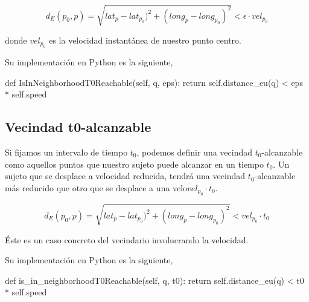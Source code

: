 \documentclass[a4paper, 12pt]{article}
\begin{document}
$$ d_E(p_0, p) = \sqrt{lat_{p} - lat_{p_0})^2 + (long_{p} - long_{p_0})^2 } < \epsilon \cdot vel_{p_0} $$

donde $vel_{p_0}$ es la velocidad instant\'anea de nuestro punto centro.


Su implementaci\'on en Python es la siguiente,

\begin{python}
        def IsInNeighborhoodT0Reachable(self, q, eps):
                return self.distance_eu(q) < eps * self.speed
\end{python}


%
%
%
%
%
%

\subsection{Vecindad t0-alcanzable}

Si fijamos un intervalo de tiempo $t_0$, podemos definir una vecindad $t_0$-alcanzable como aquellos puntos que nuestro sujeto puede alcanzar en un tiempo $t_0$. Un sujeto que se desplace a velocidad reducida, tendr\'a una vecindad $t_0$-alcanzable m\'as reducido  que otro que se desplace a una velo$vel_{p_0}\cdot t_0$. 

$$ d_E(p_0, p) = \sqrt{lat_{p} - lat_{p_0})^2 + (long_{p} - long_{p_0})^2 } < vel_{p_0} \cdot t_0 $$

\'Este es un caso concreto del vecindario involucrando la velocidad. 


Su implementaci\'on en Python es la siguiente,

\begin{python}
        def is_in_neighborhoodT0Reachable(self, q, t0):
                return self.distance_eu(q) < t0 * self.speed
\end{python}
\end{document}
